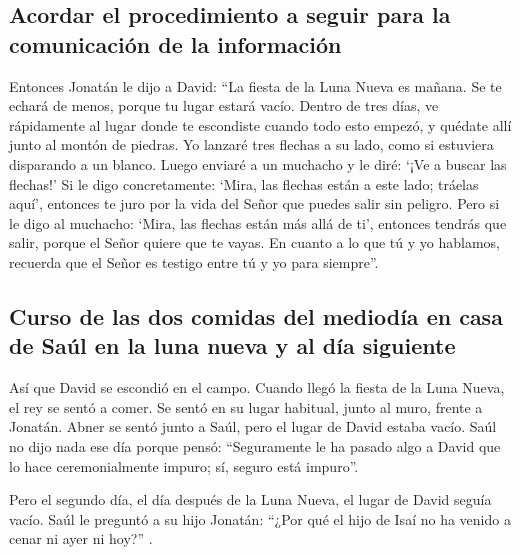 \hypertarget{acordar-el-procedimiento-a-seguir-para-la-comunicaciuxf3n-de-la-informaciuxf3n}{%
\subsection{Acordar el procedimiento a seguir para la comunicación de la
información}\label{acordar-el-procedimiento-a-seguir-para-la-comunicaciuxf3n-de-la-informaciuxf3n}}

 Entonces Jonatán le dijo a David: ``La fiesta de la Luna
Nueva es mañana. Se te echará de menos, porque tu lugar estará vacío.
 Dentro de tres días, ve rápidamente al lugar donde te
escondiste cuando todo esto empezó, y quédate allí junto al montón de
piedras.  Yo lanzaré tres flechas a su lado, como si
estuviera disparando a un blanco.  Luego enviaré a un
muchacho y le diré: `¡Ve a buscar las flechas!' Si le digo
concretamente: `Mira, las flechas están a este lado; tráelas aquí',
entonces te juro por la vida del Señor que puedes salir sin peligro.
 Pero si le digo al muchacho: `Mira, las flechas están
más allá de ti', entonces tendrás que salir, porque el Señor quiere que
te vayas.  En cuanto a lo que tú y yo hablamos, recuerda
que el Señor es testigo entre tú y yo para siempre''.

\hypertarget{curso-de-las-dos-comidas-del-medioduxeda-en-casa-de-sauxfal-en-la-luna-nueva-y-al-duxeda-siguiente}{%
\subsection{Curso de las dos comidas del mediodía en casa de Saúl en la
luna nueva y al día
siguiente}\label{curso-de-las-dos-comidas-del-medioduxeda-en-casa-de-sauxfal-en-la-luna-nueva-y-al-duxeda-siguiente}}

 Así que David se escondió en el campo. Cuando llegó la
fiesta de la Luna Nueva, el rey se sentó a comer.  Se
sentó en su lugar habitual, junto al muro, frente a Jonatán. Abner se
sentó junto a Saúl, pero el lugar de David estaba vacío. 
Saúl no dijo nada ese día porque pensó: ``Seguramente le ha pasado algo
a David que lo hace ceremonialmente impuro; sí, seguro está impuro''.

 Pero el segundo día, el día después de la Luna Nueva, el
lugar de David seguía vacío. Saúl le preguntó a su hijo Jonatán: ``¿Por
qué el hijo de Isaí no ha venido a cenar ni ayer ni hoy?'' .

